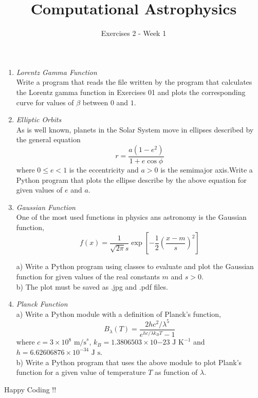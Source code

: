 \documentclass[10pt,letterpaper,notitlepage]{report}
\begin{document}
\title{Computational Astrophysics}
\author{Exercises 2 - Week 1}
\maketitle

\begin{enumerate}
\item \textit{Lorentz Gamma Function}\\
Write a program that reads the file written by the program that calculates the Lorentz gamma function in Exercises 01 and plots the corresponding curve for values of $\beta$ between $0$ and $1$.

\item \textit{Elliptic Orbits}\\
As is well known, planets in the Solar System move in ellipses described by the general equation
\begin{equation}
r = \frac{a(1-e^2)}{1+e \cos \phi}
\end{equation}
where $0 \leq e <1$ is the eccentricity and $a>0$ is the semimajor axis.Write a Python program that plots the ellipse describe by the above equation for given values of $e$ and $a$.

\item  \textit{Gaussian Function} \\
One of the most used functions in physics ans astronomy is the Gaussian function,
\begin{equation}
f(x) = \frac{1}{\sqrt{2 \pi} s} \exp{\left[ - \frac{1}{2} \left( \frac{x-m}{s}\right)^2 \right]}
\end{equation}

a) Write a Python program using classes to evaluate and plot the Gaussian function for given values of the real constants $m$ and $s>0$.\\

b) The plot must be saved as .jpg and .pdf files.


\item \textit{Planck Function}\\

a) Write a Python module with a definition of Planck's function,
\begin{equation}
B_\lambda (T) = \frac{2hc^2/\lambda^5}{e^{hc/\lambda k_BT} - 1}
\end{equation}
where $c=3\times 10^8 \textrm{ m/s}^s$, $k_B = 1.3806503 \times 10{-23} \textrm{ J K}^{-1}$ and $h = 6.62606876 \times 10^{-34} \textrm{ J s}$. \\
b) Write a Python program that uses the above module to plot Plank's function for a given value of temperature $T$ as function of $\lambda$.




\end{enumerate}

Happy Coding !!
\end{document}
